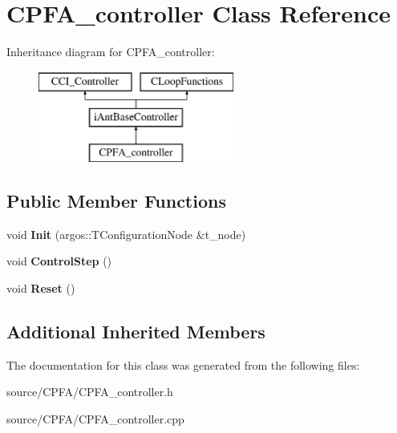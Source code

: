 \hypertarget{class_c_p_f_a__controller}{}\section{C\+P\+F\+A\+\_\+controller Class Reference}
\label{class_c_p_f_a__controller}
Inheritance diagram for C\+P\+F\+A\+\_\+controller\+:\begin{figure}[H]
\begin{center}
\leavevmode
\includegraphics[height=3.000000cm]{class_c_p_f_a__controller}
\end{center}
\end{figure}
\subsection*{Public Member Functions}
\begin{DoxyCompactItemize}
\item 
\hypertarget{class_c_p_f_a__controller_af533ecc405586f4f8c9acc05907bffad}{}void {\bfseries Init} (argos\+::\+T\+Configuration\+Node \&t\+\_\+node)\label{class_c_p_f_a__controller_af533ecc405586f4f8c9acc05907bffad}

\item 
\hypertarget{class_c_p_f_a__controller_a553ca573fb8bb5aca7bec2adba20be71}{}void {\bfseries Control\+Step} ()\label{class_c_p_f_a__controller_a553ca573fb8bb5aca7bec2adba20be71}

\item 
\hypertarget{class_c_p_f_a__controller_a3049b8dd12ffc4e6cd44ba6046d73708}{}void {\bfseries Reset} ()\label{class_c_p_f_a__controller_a3049b8dd12ffc4e6cd44ba6046d73708}

\end{DoxyCompactItemize}
\subsection*{Additional Inherited Members}


The documentation for this class was generated from the following files\+:\begin{DoxyCompactItemize}
\item 
source/\+C\+P\+F\+A/C\+P\+F\+A\+\_\+controller.\+h\item 
source/\+C\+P\+F\+A/C\+P\+F\+A\+\_\+controller.\+cpp\end{DoxyCompactItemize}
